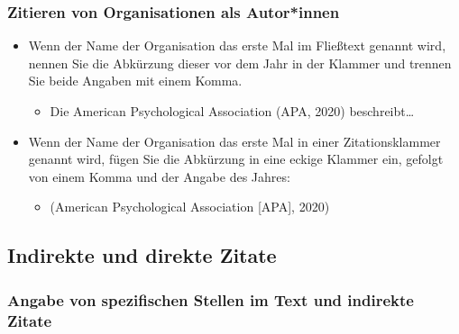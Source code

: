 \documentclass[
  letterpaper,
  DIV=11]{scrreprt}
\providecommand{\tightlist}{%
  \setlength{\itemsep}{0pt}\setlength{\parskip}{0pt}}\usepackage{longtable,booktabs,array}
\begin{document}
\hypertarget{zitieren-von-organisationen-als-autorinnen}{%
\subsubsection{Zitieren von Organisationen als
Autor*innen}\label{zitieren-von-organisationen-als-autorinnen}}

\begin{itemize}
\item
  Wenn der Name der Organisation das erste Mal im Fließtext genannt
  wird, nennen Sie die Abkürzung dieser vor dem Jahr in der Klammer und
  trennen Sie beide Angaben mit einem Komma.

  \begin{itemize}
  \tightlist
  \item
    Die American Psychological Association (APA, 2020)
    beschreibt\ldots{}
  \end{itemize}
\item
  Wenn der Name der Organisation das erste Mal in einer Zitationsklammer
  genannt wird, fügen Sie die Abkürzung in eine eckige Klammer ein,
  gefolgt von einem Komma und der Angabe des Jahres:

  \begin{itemize}
  \tightlist
  \item
    (American Psychological Association {[}APA{]}, 2020)
  \end{itemize}
\end{itemize}

\hypertarget{sec-indirect}{%
\subsection{Indirekte und direkte Zitate}\label{sec-indirect}}

\hypertarget{angabe-von-spezifischen-stellen-im-text-und-indirekte-zitate}{%
\subsubsection{Angabe von spezifischen Stellen im Text und indirekte
Zitate}\label{angabe-von-spezifischen-stellen-im-text-und-indirekte-zitate}}
\end{document}
